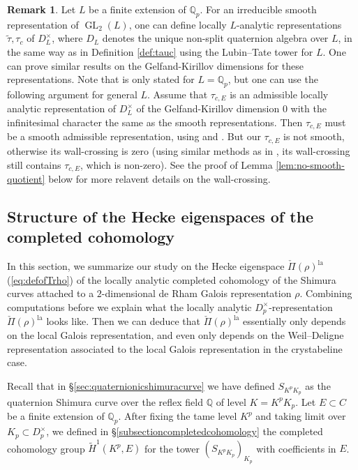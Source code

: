 \documentclass{article}
\theoremstyle{definition}
\newtheorem{remark}[theorem]{Remark}
\def\bbQ{\mathbb{Q}}
\DeclareMathOperator{\GL}{GL}
\def\lan{\mathrm{la}}
\def\tilde{\widetilde}
\begin{document}
\begin{remark}
    Let $L$ be a finite extension of $\bbQ_p$. For an irreducible smooth representation of $\GL_2(L)$, one can define locally $L$-analytic representations $\widetilde{\tau},\tau_c$ of $D_L^{\times}$, where $D_L$ denotes the unique non-split quaternion algebra over $L$, in the same way as in Definition \ref{def:tauc} using the Lubin--Tate tower for $L$. One can prove similar results on the Gelfand-Kirillov dimensions for these representations. Note that \cite[Lemma 3.9]{dospinescu2023gelfand} is only stated for $L=\bbQ_p$, but one can use the following argument for general $L$. Assume that $\tau_{c,E}$ is an admissible locally analytic representation of $D_L^{\times}$ of the Gelfand-Kirillov dimension $0$ with the infinitesimal character the same as the smooth representations. Then $\tau_{c,E}$ must be a smooth admissible representation, using \cite[Corollary 9.1]{ardakov2013irreducible} and \cite[Theorem 1.4.2]{kohlhaase2007invariant}. But our $\tau_{c,E}$ is not smooth, otherwise its wall-crossing is zero (using similar methods as in \cite[Theorem 4.7.6]{QS24}, its wall-crossing still contains $\tau_{c,E}$, which is non-zero). See the proof of Lemma \ref{lem:no-smooth-quotient} below for more relavent details on the wall-crossing. 
\end{remark}


\subsection{Structure of the Hecke eigenspaces of the completed cohomology}\label{sec:completedcohoclassicality}
In this section, we summarize our study on the Hecke eigenspace $\check\Pi(\rho)^{\lan}$ (\ref{eq:defofTrho}) of the locally analytic completed cohomology of the Shimura curves attached to a $2$-dimensional de Rham Galois representation $\rho$. Combining computations before we explain what the locally analytic $D_p^\times$-representation $\check\Pi(\rho)^{\lan}$ looks like. Then we can deduce that $\check\Pi(\rho)^{\lan}$ essentially only depends on the local Galois representation, and even only depends on the Weil--Deligne representation associated to the local Galois representation in the crystabeline case. 

Recall that in \S \ref{sec:quaternionicshimuracurve} we have defined $S_{K^pK_p}$ as the quaternion Shimura curve over the reflex field $\bbQ$ of level $K=K^pK_p$. Let $E\subset C$ be a finite extension of $\bbQ_p$. After fixing the tame level $K^p$ and taking limit over $K_p\subset D_p^\times$, we defined in \S\ref{subsectioncompletedcohomology} the completed cohomology group $\tilde{H}^1(K^p,E)$ for the tower $(S_{K^pK_p})_{K_p}$ with coefficients in $E$.
\end{document}
